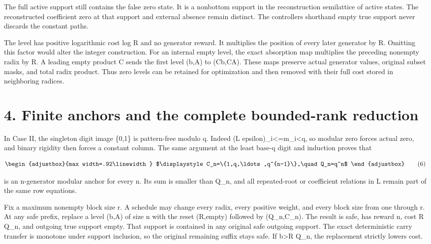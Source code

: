 The full active support still contains the false zero state. It is a nonbottom support in the reconstruction semilattice of active states. The reconstructed coefficient zero at that support and external absence remain distinct. The controller\textquotesingle s shorthand \textquotesingle empty true support\textquotesingle{} never discards the constant paths.

The level has positive logarithmic cost log R and no generator reward. It multiplies the position of every later generator by R. Omitting this factor would alter the integer construction. For an internal empty level, the exact absorption map multiplies the preceding nonempty radix by R. A leading empty product C sends the first level (b,A) to (Cb,CA). These maps preserve actual generator values, original subset masks, and total radix product. Thus zero levels can be retained for optimization and then removed with their full cost stored in neighboring radices.

\section{4. Finite anchors and the complete bounded-rank reduction}\label{n06-finite-anchors-and-the-complete-bounded-rank-reduction}

In Case II, the singleton digit image \{0,1\} is pattern-free modulo q. Indeed \textbar(L epsilon)\_i\textbar\textless=m\_i\textless q, so modular zero forces actual zero, and binary rigidity then forces a constant column. The same argument at the least base-q digit and induction proves that

\[
\begin{adjustbox}{max width=.92\linewidth}
$\displaystyle C_n=\{1,q,\ldots,q^{n-1}\},\quad Q_n=q^n$
\end{adjustbox}
\tag{6}
\]

is an n-generator modular anchor for every n. Its sum is smaller than Q\_n, and all repeated-root or coefficient relations in L remain part of the same row equations.

Fix a maximum nonempty block size r. A schedule may change every radix, every positive weight, and every block size from one through r. At any safe prefix, replace a level (b,A) of size n with the reset (R,empty) followed by (Q\_n,C\_n). The result is safe, has reward n, cost R Q\_n, and outgoing true support empty. That support is contained in any original safe outgoing support. The exact deterministic carry transfer is monotone under support inclusion, so the original remaining suffix stays safe. If b\textgreater R Q\_n, the replacement strictly lowers cost.


